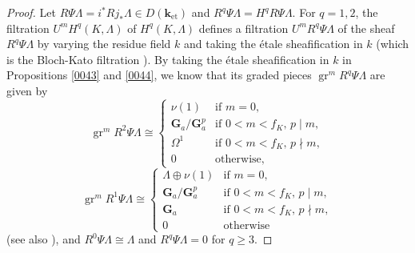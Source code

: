 \documentclass{amsart}
\theoremstyle{remark}
\numberwithin{equation}{subsection}
\newcommand{\et}{\mathrm{et}}
\newcommand{\Ga}{\mathbf{G}_{a}}
\newcommand{\alg}[1]{\mathbf{#1}}
\DeclareMathOperator{\gr}{gr}
\begin{document}
\begin{proof}
	Let $R \Psi \Lambda = i^{\ast} R j_{\ast} \Lambda \in D(\alg{k}_{\et})$ and
	$R^{q} \Psi \Lambda = H^{q} R \Psi \Lambda$.
	For $q = 1, 2$,
	the filtration $U^{m} H^{q}(K, \Lambda)$ of $H^{q}(K, \Lambda)$ defines 
	a filtration $U^{m} R^{q} \Psi \Lambda$
	of the sheaf $R^{q} \Psi \Lambda$
	by varying the residue field $k$
	and taking the \'etale sheafification in $k$
	(which is the Bloch-Kato filtration \cite[Section (1.2)]{BK86}).
	By taking the \'etale sheafification in $k$ in Propositions \ref{0043} and \ref{0044},
	we know that its graded pieces $\gr^{m} R^{q} \Psi \Lambda$ are given by
		\[
				\gr^{m} R^{2} \Psi \Lambda
			\cong
				\begin{cases}
						\nu(1)
					&	\text{if }
						m = 0,
					\\
						\Ga / \Ga^{p}
					&	\text{if }
						0 < m < f_{K},\, p \mid m,
					\\
						\Omega^{1}
					&	\text{if }
						0 < m < f_{K},\, p \nmid m,
					\\
						0
					&	\text{otherwise},
				\end{cases}
		\]
		\[
				\gr^{m} R^{1} \Psi \Lambda
			\cong
				\begin{cases}
						\Lambda \oplus \nu(1)
					&	\text{if }
						m = 0,
					\\
						\Ga / \Ga^{p}
					&	\text{if }
						0 < m < f_{K},\, p \mid m,
					\\
						\Ga
					&	\text{if }
						0 < m < f_{K},\, p \nmid m,
					\\
						0
					&	\text{otherwise}
				\end{cases}
		\]
	(see also \cite[Corollary (1.4.1)]{BK86}),
	and $R^{0} \Psi \Lambda \cong \Lambda$ and $R^{q} \Psi \Lambda = 0$ for $q \ge 3$.
	

\end{proof}
\end{document}
